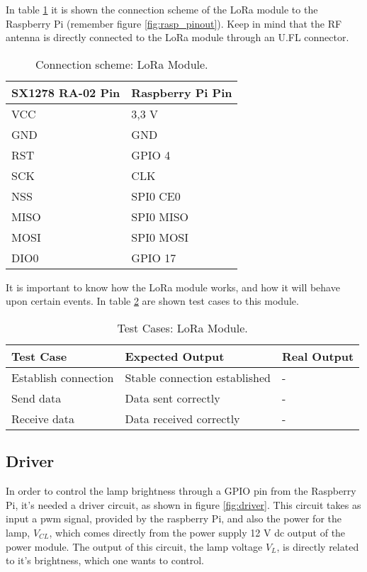 In table \ref{table:connect_lora} it is shown the connection scheme of the LoRa module to the Raspberry Pi (remember figure \ref{fig:rasp_pinout}). Keep in mind that the RF antenna is directly connected to the LoRa module through an U.FL connector.

\begin{table}[H]
	\centering
	\begin{tabular}{|m{5cm}|m{6cm}|}
		\hline
		\textbf{SX1278 RA-02 Pin} & \textbf{Raspberry Pi Pin}
		\\\hline\hline
		
		VCC & 3,3 V
		\\\hline
		GND & GND
		\\\hline
		RST & GPIO 4
		\\\hline
		SCK & CLK
		\\\hline
		NSS & SPI0 CE0
		\\\hline
		MISO & SPI0 MISO
		\\\hline
		MOSI & SPI0 MOSI
		\\\hline
		DIO0 & GPIO 17
		\\\hline
	\end{tabular}
	
	\caption{Connection scheme: LoRa Module.}
	\label{table:connect_lora}
\end{table}

It is important to know how the LoRa module works, and how it will behave upon certain events. In table \ref{table:test_lora} are shown test cases to this module.

\begin{table}[H]
	\centering
	\resizebox{\columnwidth}{!}
	{
		\begin{tabular}{|m{3cm}|m{5cm}||m{5cm}|}
			\hline
			\textbf{Test Case} & \textbf{Expected Output} & \textbf{Real Output}
			\\\hline\hline
			Establish connection & Stable connection established & -
			\\\hline
			Send data & Data sent correctly & -
			\\\hline
			Receive data & Data received correctly & -
			\\\hline
		\end{tabular}
	}
	\caption{Test Cases: LoRa Module.}
	\label{table:test_lora}
\end{table}

\subsection{Driver}
In order to control the lamp brightness through a GPIO pin from the Raspberry Pi, it's needed a driver circuit, as shown in figure \ref{fig:driver}. This circuit takes as input a \ac{pwm} signal, provided by the raspberry Pi, and also the power for the lamp, \(V_{CL}\), which comes directly from the power supply 12 V \ac{dc} output of the power module. The output of this circuit, the lamp voltage \(V_{L}\), is directly related to it's brightness, which one wants to control.

